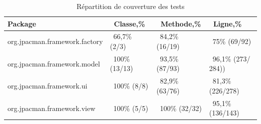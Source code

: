 \documentclass[12pt,a4paper,final]{article}
\begin{document}
\begin{table}[!h]
\begin{tabular}{|l|l|l|l|}
\hline
Package & \ Classe,\% & \ Methode,\% & \ Ligne,\% \\
\hline
org.jpacman.framework.factory & \ 66,7\% (2/3) & \ 84,2\% (16/19) & \ 75\% (69/92) \\
\hline
org.jpacman.framework.model & \ 100\% (13/13) & \ 93,5\% (87/93) & \ 96,1\% (273/ 284)) \\
\hline
org.jpacman.framework.ui & \ 100\% (8/8) & \ 82,9\% (63/76) & \ 81,3\% (226/278) \\
\hline
org.jpacman.framework.view & \ 100\% (5/5) & \ 100\% (32/32) & \ 95,1\% (136/143) \\
\hline

\end{tabular}
\caption{Répartition de couverture des tests}
\label{Répartition de couverture des tests}
\end{table}

\end{document}
